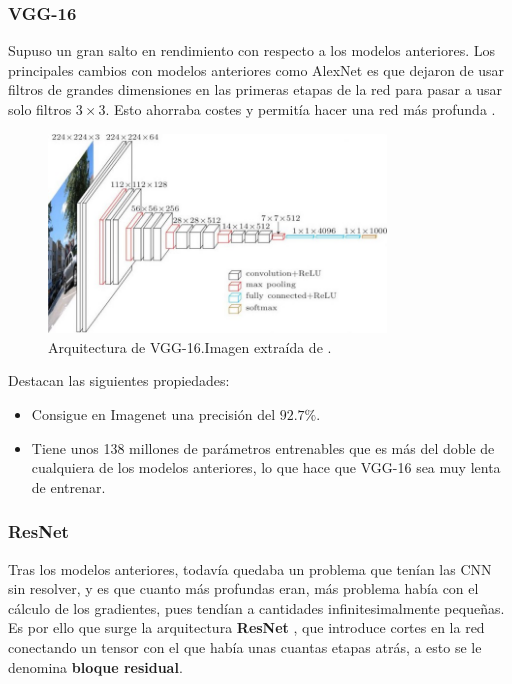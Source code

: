         \subsubsection{VGG-16}
            \noindent Supuso un gran salto en rendimiento con respecto a los modelos anteriores. Los principales cambios con modelos anteriores como AlexNet es que dejaron de usar filtros de grandes dimensiones en las primeras etapas de la red para pasar a usar solo filtros $3 \times 3$. Esto ahorraba costes y permitía hacer una red más profunda \cite{simonyan2014very}.

            \begin{figure}[!h]
                \centering
                \includegraphics[width=0.8\textwidth]{img/VGG-16.jpeg}
                \caption{Arquitectura de VGG-16.Imagen extraída de \cite{StanfordCourse}.}
                \label{fig:VGG}
            \end{figure}

            \noindent Destacan las siguientes propiedades:

            \begin{itemize}
                \item Consigue en Imagenet una precisión del $92.7 \%$.
                \item Tiene unos 138 millones de parámetros entrenables que es más del doble de cualquiera de los modelos anteriores, lo que hace que VGG-16 sea muy lenta de entrenar.
            \end{itemize}

        \subsubsection{ResNet}

            \noindent Tras los modelos anteriores, todavía quedaba un problema que tenían las CNN sin resolver, y es que cuanto más profundas eran, más problema había con el cálculo de los gradientes, pues tendían a cantidades infinitesimalmente pequeñas. Es por ello que surge la arquitectura \textbf{ResNet} \cite{he2016deep}, que introduce cortes en la red conectando un tensor con el que había unas cuantas etapas atrás, a esto se le denomina \textbf{bloque residual}. 


